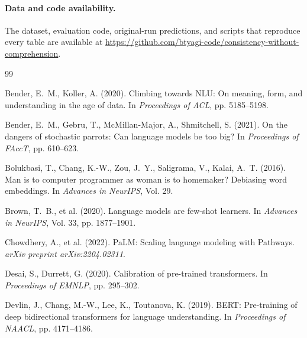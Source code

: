 \documentclass[11pt]{article}
\begin{document}
\paragraph{Data and code availability.} The dataset, evaluation code, original-run predictions, and scripts that reproduce every table are available at \url{https://github.com/btyagi-code/consistency-without-comprehension}.

\newpage
\begingroup
\small
\setlength{\bibsep}{3pt}


\begin{thebibliography}{99}

Bender, E.~M., Koller, A. (2020).
\newblock Climbing towards NLU: On meaning, form, and understanding in the age of data.
\newblock In \textit{Proceedings of ACL}, pp. 5185--5198.

Bender, E.~M., Gebru, T., McMillan-Major, A., Shmitchell, S. (2021).
\newblock On the dangers of stochastic parrots: Can language models be too big?
\newblock In \textit{Proceedings of FAccT}, pp. 610--623.

Bolukbasi, T., Chang, K.-W., Zou, J.~Y., Saligrama, V., Kalai, A.~T. (2016).
\newblock Man is to computer programmer as woman is to homemaker? Debiasing word embeddings.
\newblock In \textit{Advances in NeurIPS}, Vol. 29.

Brown, T.~B., et al. (2020).
\newblock Language models are few-shot learners.
\newblock In \textit{Advances in NeurIPS}, Vol. 33, pp. 1877--1901.

Chowdhery, A., et al. (2022).
\newblock PaLM: Scaling language modeling with Pathways.
\newblock \textit{arXiv preprint arXiv:2204.02311}.

Desai, S., Durrett, G. (2020).
\newblock Calibration of pre-trained transformers.
\newblock In \textit{Proceedings of EMNLP}, pp. 295--302.

Devlin, J., Chang, M.-W., Lee, K., Toutanova, K. (2019).
\newblock BERT: Pre-training of deep bidirectional transformers for language understanding.
\newblock In \textit{Proceedings of NAACL}, pp. 4171--4186.


\end{thebibliography}
\end{document}
